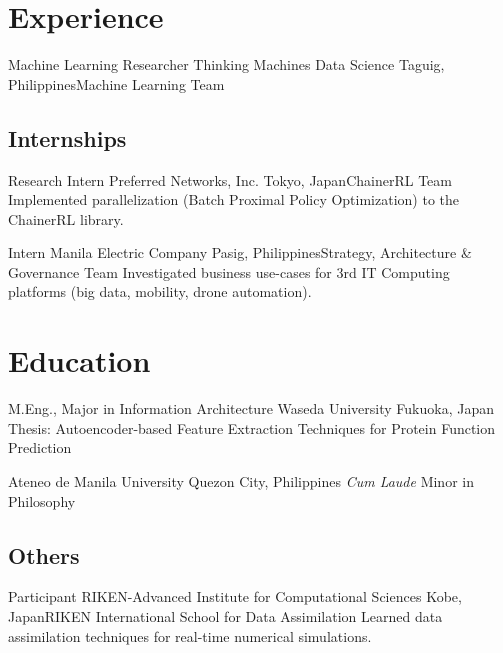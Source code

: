 \documentclass[11pt,a4paper,sans]{moderncv}
\begin{document}
\maketitle

\section{Experience}
        {Machine Learning Researcher}
        {Thinking Machines Data Science}
        {Taguig, Philippines}{Machine Learning Team}
        {
        }

\subsection{Internships}

        {Research Intern}
        {Preferred Networks, Inc.}
        {Tokyo, Japan}{ChainerRL Team}
        {Implemented parallelization (Batch Proximal Policy Optimization) to
        the ChainerRL library.}

        {Intern}
        {Manila Electric Company}
        {Pasig, Philippines}{Strategy, Architecture \& Governance Team}
        {Investigated business use-cases for 3rd IT Computing platforms (big data,
        mobility, drone automation).}


\section{Education}
        {M.Eng., Major in Information Architecture}
        {Waseda University}
        {Fukuoka, Japan}{}
        {Thesis: Autoencoder-based Feature Extraction Techniques for Protein
        Function Prediction}

        {Ateneo de Manila University}
        {Quezon City, Philippines}
        {\textit{Cum Laude}}
        {Minor in Philosophy}


\subsection{Others}

        {Participant}
        {RIKEN-Advanced Institute for Computational Sciences}
        {Kobe, Japan}{RIKEN International School for Data Assimilation}
        {Learned data assimilation techniques for real-time numerical simulations.}
\end{document}
